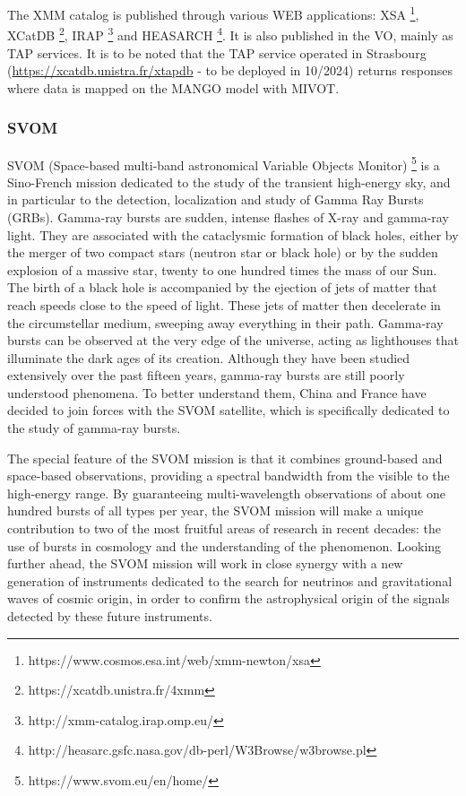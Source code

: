 \documentclass[11pt,a4paper]{ivoa}
\begin{document}
The XMM catalog is published through various WEB applications: XSA \footnote{https://www.cosmos.esa.int/web/xmm-newton/xsa},
XCatDB \footnote{https://xcatdb.unistra.fr/4xmm}, IRAP \footnote{http://xmm-catalog.irap.omp.eu/} and
HEASARCH \footnote{http://heasarc.gsfc.nasa.gov/db-perl/W3Browse/w3browse.pl}.
It is also published in the VO, mainly as TAP services. 
It is to be noted that the TAP service operated in Strasbourg (\url{https://xcatdb.unistra.fr/xtapdb} - to be deployed in 10/2024) returns responses where data is mapped on the MANGO model with MIVOT. 



\subsubsection{SVOM}

SVOM (Space-based multi-band astronomical Variable Objects Monitor) \footnote{https://www.svom.eu/en/home/} 
is a Sino-French mission dedicated
to the study of the transient high-energy sky, and in particular to the detection, localization and 
study of Gamma Ray Bursts (GRBs).
Gamma-ray bursts are sudden, intense flashes of X-ray and gamma-ray light.
They are associated with the cataclysmic formation of black holes, either by the merger of two compact stars 
(neutron star or black hole) or by the sudden explosion of a massive star, twenty to one hundred times the mass of our Sun.
The birth of a black hole is accompanied by the ejection of jets of matter that reach speeds close to the speed of light.
These jets of matter then decelerate in the circumstellar medium, sweeping away everything in their path.
Gamma-ray bursts can be observed at the very edge of the universe, acting as lighthouses that illuminate 
the dark ages of its creation. Although they have been studied extensively over the past fifteen years,
gamma-ray bursts are still poorly understood phenomena. To better understand them, China and France have decided
to join forces with the SVOM satellite, which is specifically dedicated to the study of gamma-ray bursts.

The special feature of the SVOM mission is that it combines ground-based and space-based observations,
providing a spectral bandwidth from the visible to the high-energy range. By guaranteeing multi-wavelength
observations of about one hundred bursts of all types per year, the SVOM mission will make a unique contribution
to two of the most fruitful areas of research in recent decades: the use of bursts in cosmology and the understanding
of the phenomenon. Looking further ahead, the SVOM mission will work in close synergy with a new generation of
instruments dedicated to the search for neutrinos and gravitational waves of cosmic origin, in order to confirm
the astrophysical origin of the signals detected by these future instruments.
\end{document}
